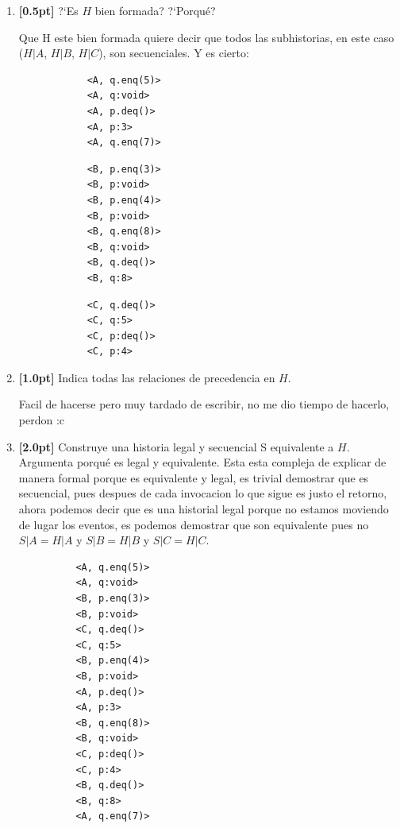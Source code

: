 \documentclass[a4paper,11pt]{article}
\begin{document}
\begin{enumerate}
{\begin{enumerate}
        \item{
          \textbf{[0.5pt]} ?`Es $H$ bien formada? ?`Porqué?
          
          Que H este bien formada quiere decir que todos las subhistorias, en este caso ($H|A$, $H|B$, $H|C$), son
          secuenciales.
          Y es cierto:

          \begin{verbatim}
            <A, q.enq(5)>
            <A, q:void>
            <A, p.deq()>
            <A, p:3>
            <A, q.enq(7)>
          \end{verbatim}

          \begin{verbatim}
            <B, p.enq(3)>
            <B, p:void>
            <B, p.enq(4)>
            <B, p:void>
            <B, q.enq(8)>
            <B, q:void>
            <B, q.deq()>
            <B, q:8>
          \end{verbatim}

          \begin{verbatim}
            <C, q.deq()>
            <C, q:5>
            <C, p:deq()>
            <C, p:4>
          \end{verbatim}

          }
        \item{\textbf{[1.0pt]} Indica todas las relaciones de precedencia en $H$.
        
          Facil de hacerse pero muy tardado de escribir, no me dio tiempo de hacerlo, perdon :c

        }
        
        \item{
          
        \textbf{[2.0pt]} Construye una historia legal y secuencial S equivalente a $H$. Argumenta porqué es legal y equivalente.
        Esta esta compleja de explicar de manera formal porque es equivalente y legal, es trivial demostrar
        que es secuencial, pues despues de cada invocacion lo que sigue es justo el retorno, 
        ahora podemos decir que es una historial legal porque no estamos moviendo de lugar los eventos,
        es 
        podemos demostrar que son equivalente pues no $S|A = H|A$ y $S|B = H|B$ y $S|C = H|C$.

        \begin{verbatim}
          <A, q.enq(5)>
          <A, q:void>
          <B, p.enq(3)>
          <B, p:void>
          <C, q.deq()>
          <C, q:5>
          <B, p.enq(4)>
          <B, p:void>
          <A, p.deq()>
          <A, p:3>
          <B, q.enq(8)>
          <B, q:void>
          <C, p:deq()>
          <C, p:4>
          <B, q.deq()>
          <B, q:8>
          <A, q.enq(7)>
        \end{verbatim}

}
\end{enumerate}}
\end{enumerate}
\end{document}
